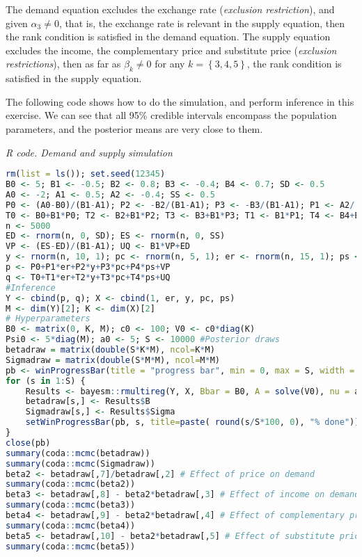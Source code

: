 \begin{enumerate}[leftmargin=*]
The demand equation excludes the exchange rate (\textit{exclusion restriction}), and given $\alpha_3\neq 0$, that is, the exchange rate is relevant in the supply equation, then the rank condition is satisfied in the demand equation. The supply equation excludes the income, the complementary price and substitute price (\textit{exclusion restrictions}), then as far as $\beta_k\neq 0$ for any $k=\left\{3,4,5\right\}$, the rank condition is satisfied in the supply equation.

The following code shows how to do the simulation, and perform inference in this exercise. We can see that all 95\% credible intervals encompass the population parameters, and the posterior means are very close to them.
 
\begin{tcolorbox}[enhanced,width=4.67in,center upper,
	fontupper=\large\bfseries,drop shadow southwest,sharp corners]
	\textit{R code. Demand and supply simulation}
	\begin{VF}
		\begin{lstlisting}[language=R]
rm(list = ls()); set.seed(12345)
B0 <- 5; B1 <- -0.5; B2 <- 0.8; B3 <- -0.4; B4 <- 0.7; SD <- 0.5
A0 <- -2; A1 <- 0.5; A2 <- -0.4; SS <- 0.5
P0 <- (A0-B0)/(B1-A1); P2 <- -B2/(B1-A1); P3 <- -B3/(B1-A1); P1 <- A2/(B1-A1); P4 <- -B4/(B1-A1)
T0 <- B0+B1*P0; T2 <- B2+B1*P2; T3 <- B3+B1*P3; T1 <- B1*P1; T4 <- B4+B1*P4;
n <- 5000
ED <- rnorm(n, 0, SD); ES <- rnorm(n, 0, SS)
VP <- (ES-ED)/(B1-A1); UQ <- B1*VP+ED
y <- rnorm(n, 10, 1); pc <- rnorm(n, 5, 1); er <- rnorm(n, 15, 1); ps <- rnorm(n, 5, 1);
p <- P0+P1*er+P2*y+P3*pc+P4*ps+VP
q <- T0+T1*er+T2*y+T3*pc+T4*ps+UQ
#Inference
Y <- cbind(p, q); X <- cbind(1, er, y, pc, ps)
M <- dim(Y)[2]; K <- dim(X)[2]
# Hyperparameters
B0 <- matrix(0, K, M); c0 <- 100; V0 <- c0*diag(K)
Psi0 <- 5*diag(M); a0 <- 5; S <- 10000 #Posterior draws
betadraw = matrix(double(S*K*M), ncol=K*M)
Sigmadraw = matrix(double(S*M*M), ncol=M*M)
pb <- winProgressBar(title = "progress bar", min = 0, max = S, width = 300)
for (s in 1:S) {
	Results <- bayesm::rmultireg(Y, X, Bbar = B0, A = solve(V0), nu = a0, V = Psi0)
	betadraw[s,] <- Results$B
	Sigmadraw[s,] <- Results$Sigma
	setWinProgressBar(pb, s, title=paste( round(s/S*100, 0), "% done"))
}
close(pb)
summary(coda::mcmc(betadraw))
summary(coda::mcmc(Sigmadraw))
beta2 <- betadraw[,7]/betadraw[,2] # Effect of price on demand 
summary(coda::mcmc(beta2))
beta3 <- betadraw[,8] - beta2*betadraw[,3] # Effect of income on demand
summary(coda::mcmc(beta3))
beta4 <- betadraw[,9] - beta2*betadraw[,4] # Effect of complementary price on demand
summary(coda::mcmc(beta4))
beta5 <- betadraw[,10] - beta2*betadraw[,5] # Effect of substitute price  on demand
summary(coda::mcmc(beta5))
\end{lstlisting}
	\end{VF}
\end{tcolorbox} 



\end{enumerate}